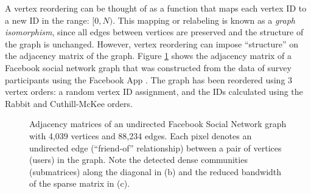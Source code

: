 \par A vertex reordering can be thought of as a function that maps each vertex ID to a new ID in the range: $[0, N)$. This mapping or relabeling is known as a \textit{graph isomorphism}, since all edges between vertices are preserved and the structure of the graph is unchanged. However, vertex reordering can impose ``structure'' on the adjacency matrix of the graph. Figure \ref{fig:fb_adjmats} shows the adjacency matrix of a Facebook social network graph that was constructed from the data of survey participants using the Facebook App \cite{leskovec2012learning}. The graph has been reordered using 3 vertex orders: a random vertex ID assignment, and the IDs calculated using the Rabbit and Cuthill-McKee orders. 

\begin{figure}[!htp]

  \centering
  \hfil   
  \hfil
  \caption{Adjacency matrices of an undirected Facebook Social Network graph with 4,039 vertices and 88,234 edges. Each pixel denotes an undirected edge (``friend-of'' relationship) between a pair of vertices (users) in the graph. Note the detected dense communities (submatrices) along the diagonal in (b) and the reduced bandwidth of the sparse matrix in (c). }\label{fig:fb_adjmats}
  \end{figure}


